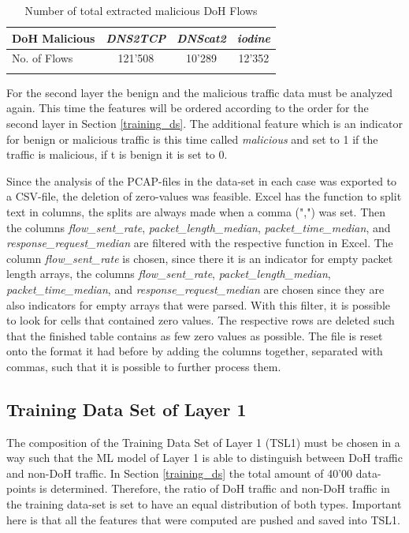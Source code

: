 \begin{center}
\begin{longtable}{ |l|c|c|c| }
\hline
DoH Malicious & \textit{DNS2TCP} & \textit{DNScat2} & \textit{iodine} \\
\hline
No. of Flows & 121'508 & 10'289 & 12'352 \\
\hline
\caption{Number of total extracted malicious DoH Flows}
\end{longtable}
\label{tab:malicious_doh}
\end{center}

For the second layer the benign and the malicious traffic data must be analyzed again. This time the features will be ordered according to the order for the second layer in Section \ref{training_ds}. The additional feature which is an indicator for benign or malicious traffic is this time called \textit{malicious} and set to 1 if the traffic is malicious, if t is benign it is set to 0.

Since the analysis of the PCAP-files in the data-set in each case was exported to a CSV-file, the deletion of zero-values was feasible. Excel has the function to split text in columns, the splits are always made when a comma (",") was set. Then the columns \textit{flow\_sent\_rate}, \textit{packet\_length\_median}, \textit{packet\_time\_median}, and \textit{response\_request\_median} are filtered with the respective function in Excel. The column \textit{flow\_sent\_rate} is chosen, since there it is an indicator for empty packet length arrays, the columns \textit{flow\_sent\_rate}, \textit{packet\_length\_median}, \textit{packet\_time\_median}, and \textit{response\_request\_median} are chosen since they are also indicators for empty arrays that were parsed. With this filter, it is possible to look for cells that contained zero values. The respective rows are deleted such that the finished table contains as few zero values as possible. The file is reset onto the format it had before by adding the columns together, separated with commas, such that it is possible to further process them.

\subsection{Training Data Set of Layer 1} \label{tsl1}
The composition of the Training Data Set of Layer 1 (TSL1) must be chosen in a way such that the ML model of Layer 1 is able to distinguish between DoH traffic and non-DoH traffic. In Section \ref{training_ds} the total amount of 40'00 data-points is determined. Therefore, the ratio of DoH traffic and non-DoH traffic in the training data-set is set to have an equal distribution of both types. Important here is that all the features that were computed are pushed and saved into TSL1. 


